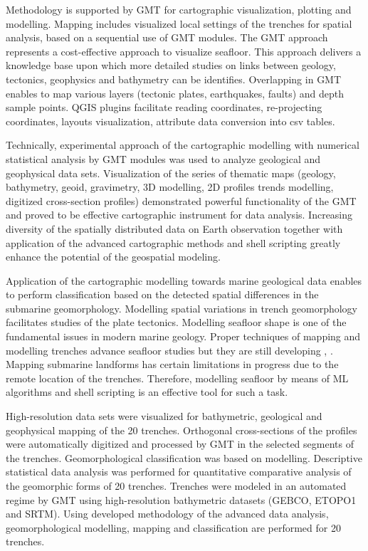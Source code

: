 \documentclass[11pt,a4paper]{report}
\begin{document}
{Methodology is supported by \ac{GMT} for cartographic visualization, plotting and modelling. Mapping includes visualized local settings of the trenches for spatial analysis, based on a sequential use of \ac{GMT} modules. The \ac{GMT} approach represents a cost-effective approach to visualize seafloor. This approach delivers a knowledge base upon which more detailed studies on links between geology, tectonics, geophysics and bathymetry can be identifies. Overlapping in \ac{GMT} enables to map various layers (tectonic plates, earthquakes, faults) and depth sample points. \ac{QGIS} plugins facilitate reading coordinates, re-projecting coordinates, layouts visualization, attribute data conversion into csv tables.

Technically, experimental approach of the cartographic modelling with numerical statistical analysis by \ac{GMT} modules was used to analyze geological and geophysical data sets. Visualization of the series of thematic maps (geology, bathymetry, geoid, gravimetry, 3D modelling, 2D profiles trends modelling, digitized cross-section profiles) demonstrated powerful functionality of the \ac{GMT} and proved to be effective cartographic instrument for data analysis. Increasing diversity of the spatially distributed data on Earth observation together with application of the advanced cartographic methods and shell scripting greatly enhance the potential of the geospatial modeling.

Application of the cartographic modelling towards marine geological data enables to perform classification based on the detected spatial differences in the submarine geomorphology. Modelling spatial variations in trench geomorphology facilitates studies of the plate tectonics. Modelling seafloor shape is one of the fundamental issues in modern marine geology. Proper techniques of mapping and modelling trenches advance seafloor studies but they are still developing \cite{Wadge}, \cite{WesselSmith1991}. Mapping submarine landforms has certain limitations in progress due to the remote location of the trenches. Therefore, modelling seafloor by means of  \ac{ML} algorithms and shell scripting is an effective tool for such a task. 

High-resolution data sets were visualized for bathymetric, geological and geophysical mapping of the 20 trenches. Orthogonal cross-sections of the profiles were automatically digitized and processed by \ac{GMT} in the selected segments of the trenches. Geomorphological classification was based on modelling. Descriptive statistical data analysis was performed for quantitative comparative analysis of the geomorphic forms of 20 trenches. Trenches were modeled in an automated regime by \ac{GMT} using high-resolution bathymetric datasets (\ac{GEBCO}, \ac{ETOPO1} and \ac{SRTM}). Using developed methodology of the advanced data analysis, geomorphological modelling, mapping and classification are performed for 20 trenches. 

}
\end{document}
